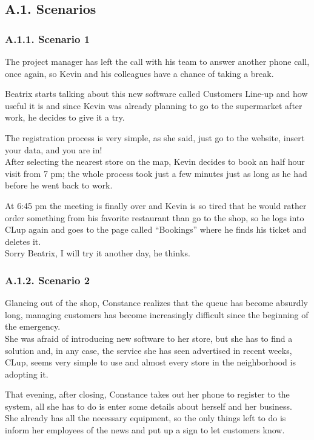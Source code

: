\subsection{A.1. Scenarios}

\subsubsection{A.1.1. Scenario 1}

The project manager has left the call with his team to answer another phone call, once again, so Kevin and his colleagues have a chance of taking a break.

Beatrix starts talking about this new software called Customers Line-up and how useful it is and since Kevin was already planning to go to the supermarket after work, he decides to give it a try.

The registration process is very simple, as she said, just go to the website, insert your data, and you are in!\\
After selecting the nearest store on the map, Kevin decides to book an half hour visit from 7 pm; the whole process took just a few minutes just as long as he had before he went back to work.

At 6:45 pm the meeting is finally over and Kevin is so tired that he would rather order something from his favorite restaurant than go to the shop, so he logs into CLup again and goes to the page called ``Bookings'' where he finds his ticket and deletes it.\\
Sorry Beatrix, I will try it another day, he thinks.

\subsubsection{A.1.2. Scenario 2}

Glancing out of the shop, Constance realizes that the queue has become absurdly long, managing customers has become increasingly difficult since the beginning of the emergency.\\
She was afraid of introducing new software to her store, but she has to find a solution and, in any case, the service she has seen advertised in recent weeks, CLup, seems very simple to use and almost every store in the neighborhood is adopting it.

\clearpage
That evening, after closing, Constance takes out her phone to register to the system, all she has to do is enter some details about herself and her business.\\
She already has all the necessary equipment, so the only things left to do is inform her employees of the news and put up a sign to let customers know.

